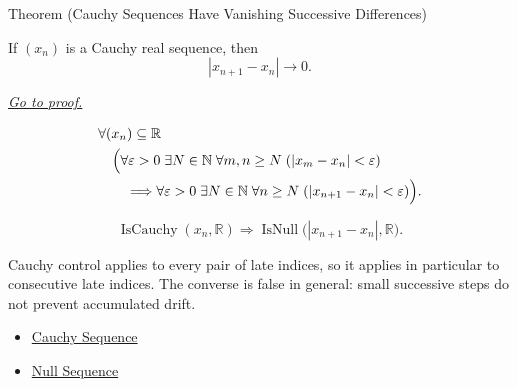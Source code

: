 
\begin{theorembox}{Theorem (Cauchy Sequences Have Vanishing Successive Differences)}
\begin{theorem}
\label{thm:cauchy-successive-differences-vanish}
If $(x_n)$ is a Cauchy real sequence, then
\[
  |x_{n+1}-x_n|\to 0.
\]

\smallskip
\noindent
\hyperref[prf:cauchy-successive-differences-vanish]{\textit{Go to proof.}}
\end{theorem}
\end{theorembox}

\begin{remark*}
\[
\begin{aligned}
&\forall (x_n)\subseteq\mathbb{R}\\
&\quad
\Bigl(
  \forall \varepsilon>0\;\exists N\in\mathbb{N}\;\forall m,n\ge N
  \;( |x_m-x_n|<\varepsilon )\\
&\qquad\Longrightarrow
  \forall \varepsilon>0\;\exists N\in\mathbb{N}\;\forall n\ge N
  \;( |x_{n+1}-x_n|<\varepsilon )
\Bigr).
\end{aligned}
\]
\end{remark*}

\begin{remark*}
\[
\operatorname{IsCauchy}(x_n,\mathbb{R})
\Longrightarrow
\operatorname{IsNull}\bigl(|x_{n+1}-x_n|,\mathbb{R}\bigr).
\]
\end{remark*}

\begin{remark*}[Interpretation]
Cauchy control applies to every pair of late indices, so it applies in
particular to consecutive late indices. The converse is false in general:
small successive steps do not prevent accumulated drift.
\end{remark*}

\begin{dependencies}
\begin{itemize}
  \item \hyperref[def:cauchy-sequence]{Cauchy Sequence}
  \item \hyperref[def:null-sequence]{Null Sequence}
\end{itemize}
\end{dependencies}


